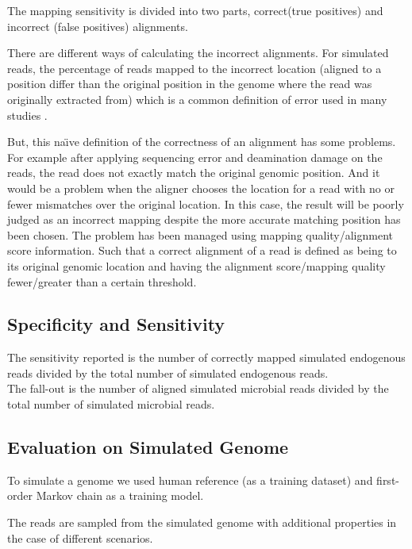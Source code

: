 \documentclass[11pt,a4paper]{report}
\begin{document}
The mapping sensitivity is divided into two parts, correct(true positives) and incorrect (false positives) alignments.

There are different ways of calculating the incorrect alignments. For simulated reads,
the percentage of reads mapped to the incorrect location (aligned to a position differ than the original position in the genome where the read was originally extracted from) which is a common definition of error used in many studies \cite{ErrorDef}. 

But, this na\"{\i}ve definition of the correctness of an alignment has some problems. For example after applying sequencing error and deamination damage on the reads, the read does not exactly match the original genomic position. And it would be a problem when the aligner chooses the location for a read with no or fewer mismatches over the original location. In this case, the result will be poorly judged as an incorrect mapping despite the more accurate matching position has been chosen. 
The problem has been managed using mapping quality/alignment score information. Such that a correct alignment of a read is defined as being to its original genomic location and having the alignment score/mapping quality fewer/greater than a certain threshold. 



\subsection{Specificity and Sensitivity}


The sensitivity reported is the number of correctly mapped simulated
endogenous reads divided by the total number of simulated endogenous reads.\\ 
The fall-out is the number of aligned simulated microbial reads 
divided by the total number of simulated microbial reads.



\subsection{Evaluation on Simulated Genome}

To simulate a genome we used human reference (as a training dataset) and first-order Markov chain as a training model. 

The reads are sampled from the simulated genome 
with additional properties in the case of different scenarios.
\end{document}
